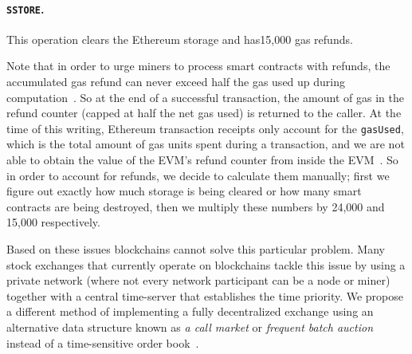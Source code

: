 \begin{itemize}
\paragraph{\texttt{SSTORE}.} This operation clears the Ethereum storage and has15,000 gas refunds. 


Note that in order to urge miners to process smart contracts with refunds, the accumulated gas refund can never exceed half the gas used up during computation~\cite{wood2014ethereum}. So at the end of a successful transaction, the amount of gas in the refund counter (capped at half the net gas used) is returned to the caller. At the time of this writing, Ethereum transaction receipts only account for the \texttt{gasUsed}, which is the total amount of gas units spent during a transaction, and we are not able to obtain the value of the EVM's refund counter from inside the EVM~\cite{signer2018gas}. So in order to account for refunds, we decide to calculate them manually; first we figure out exactly how much storage is being cleared or how many smart contracts are being destroyed, then we multiply these numbers by 24,000 and 15,000 respectively. 




%


Based on these issues blockchains cannot solve this particular problem. Many stock exchanges that currently operate on blockchains tackle this issue by using a private network (where not every network participant can be a node or miner) together with a central time-server that establishes the time priority. We propose a different method of implementing a fully decentralized exchange using an alternative data structure known as \textit{a call market} or \textit{frequent batch auction} instead of a time-sensitive order book~\cite{clark2014decentralizing}.

\end{itemize}

